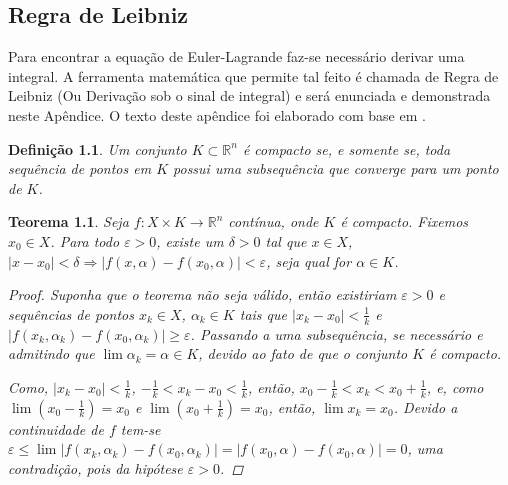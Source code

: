 \documentclass[
	12pt,				%
	openright,			%
    twoside,			%
	a4paper,			%
	english,			%
	french,				%
	spanish,			%
	brazil				%
	]{abntex2}
\newtheorem{teorema}{Teorema}
\newtheorem{definicao}{Definição}
\numberwithin{lema}{chapter}
\numberwithin{teorema}{chapter}
\numberwithin{definicao}{chapter}
\numberwithin{figure}{chapter}
\begin{document}
\begin{apendicesenv}

\partapendices

\chapter{Regra de Leibniz}
\label{apend:regra_de_leibniz}
{
	Para encontrar a equação de Euler-Lagrande faz-se necessário derivar uma integral. A ferramenta matemática que permite tal feito é chamada de Regra de Leibniz (Ou Derivação sob o sinal de integral) e será enunciada e demonstrada neste Apêndice. O texto deste apêndice foi elaborado com base em .

	\begin{definicao}
		Um conjunto $K\subset \mathbb{R}^n$ é compacto se, e somente se, toda sequência de pontos em $K$ possui uma subsequência que converge para um ponto de $K$.
	\end{definicao}

	\begin{teorema}
		\label{teorema:func_uniformemente}
		Seja $f:X\times K \longrightarrow \mathbb{R}^n$ contínua, onde $K$ é compacto. Fixemos $x_0 \in X$. Para todo $\varepsilon > 0$, existe um $\delta > 0$ tal que $x\in X$, $|x-x_0|<\delta \Longrightarrow |f(x, \alpha)-f(x_0,\alpha)|<\varepsilon$, seja qual for $\alpha \in K$.
		\begin{proof}
		Suponha que o teorema não seja válido, então existiriam $\varepsilon > 0$ e sequências de pontos $x_k\in X$, $\alpha_k \in K$ tais que $|x_k-x_0|<\frac{1}{k}$ e $|f(x_k,\alpha_k)-f(x_0,\alpha_k)|\geqslant \varepsilon$. Passando a uma subsequência, se necessário e admitindo que $\lim \alpha_k=\alpha \in K$, devido ao fato de que o conjunto $K$ é compacto.
		
		Como, $|x_k-x_0|<\frac{1}{k}$, $-\frac{1}{k}<x_k-x_0<\frac{1}{k}$, então, $x_0-\frac{1}{k}<x_k<x_0+\frac{1}{k}$, e, como $\lim \left (x_0-\frac{1}{k} \right ) = x_0$ e $\lim \left ( x_0 + \frac{1}{k} \right )=x_0$, então, $\lim x_k=x_0$. Devido a continuidade de $f$ tem-se $\varepsilon \leqslant \lim |f(x_k,\alpha_k)-f(x_0,\alpha _k)|=|f(x_0,\alpha)-f(x_0,\alpha)|=0$, uma contradição, pois da hipótese $\varepsilon >0$.
		\end{proof}
	\end{teorema}
	
}
\end{apendicesenv}
\end{document}
